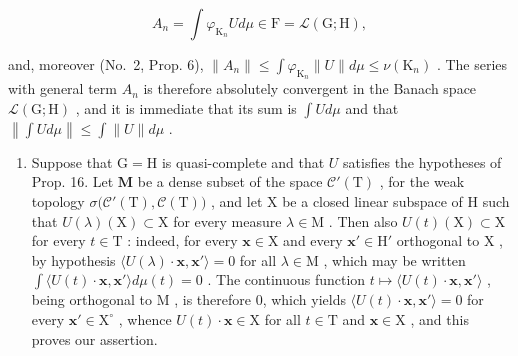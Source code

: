 \[
A _ {n} = \int \varphi_ {\mathrm{K} _ {n}} U d \mu \in \mathrm{F} = \mathcal {L} (\mathrm{G}; \mathrm{H}),
\]

and, moreover (No.~2, Prop. 6), \(\| A_n\| \leqslant \int \varphi_{\mathrm{K}_n}\| U\| d\mu \leqslant \nu (\mathrm{K}_n)\) . The series with general term \(A_{n}\) is therefore absolutely convergent in the Banach space \(\mathcal{L}(\mathrm{G};\mathrm{H})\) , and it is immediate that its sum is \(\int Ud\mu\) and that \(\left\| \int Ud\mu \right\| \leqslant \int \| U\| d\mu\) .

\begin{enumerate}
\def\labelenumi{\arabic{enumi})}
\setcounter{enumi}{1}
\tightlist
\item
  Suppose that \(\mathrm{G} = \mathrm{H}\) is quasi-complete and that \(U\) satisfies the hypotheses of Prop. 16. Let \(\mathbf{M}\) be a dense subset of the space \(\mathcal{C}'(\mathrm{T})\) , for the weak topology \(\sigma\big(\mathcal{C}'(\mathrm{T}),\mathcal{C}(\mathrm{T})\big)\) , and let \(\mathrm{X}\) be a closed linear subspace of \(\mathrm{H}\) such that \(U(\lambda)(\mathrm{X})\subset \mathrm{X}\) for every measure \(\lambda \in \mathrm{M}\) . Then also \(U(t)(\mathrm{X})\subset \mathrm{X}\) for every \(t\in \mathrm{T}\) : indeed, for every \(\mathbf{x}\in \mathrm{X}\) and every \(\mathbf{x}'\in \mathrm{H}'\) orthogonal to \(\mathrm{X}\) , by hypothesis \(\langle U(\lambda)\cdot \mathbf{x},\mathbf{x}'\rangle = 0\) for all \(\lambda \in \mathrm{M}\) , which may be written \(\int \langle U(t)\cdot \mathbf{x},\mathbf{x}'\rangle d\mu (t) = 0\) . The continuous function \(t\mapsto \langle U(t)\cdot \mathbf{x},\mathbf{x}'\rangle\) , being orthogonal to \(\mathrm{M}\) , is therefore 0, which yields \(\langle U(t)\cdot \mathbf{x},\mathbf{x}'\rangle = 0\) for every \(\mathbf{x}'\in \mathrm{X}^\circ\) , whence \(U(t)\cdot \mathbf{x}\in \mathrm{X}\) for all \(t\in \mathrm{T}\) and \(\mathbf{x}\in \mathrm{X}\) , and this proves our assertion.
\end{enumerate}

